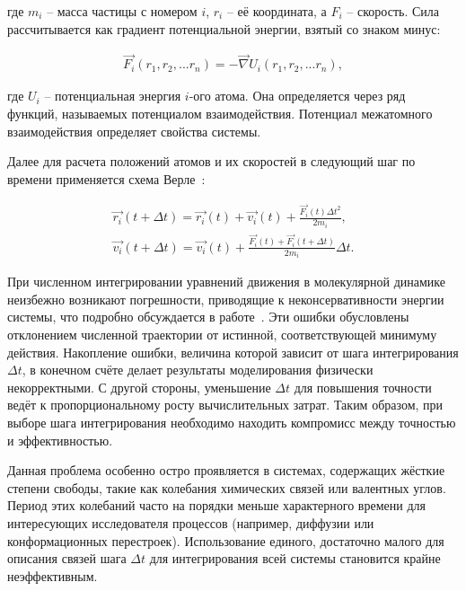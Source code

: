 где $m_i$ \--- масса частицы с номером $i$, $r_i$ \--- её координата, а $F_i$ \--- скорость. Сила рассчитывается как  градиент потенциальной энергии, взятый со знаком минус:

\begin{align}
	\overrightarrow{F_i}(r_1, r_2, ... r_n) = -\overrightarrow{\nabla}U_i(r_1, r_2, ... r_n),
\end{align}

где $U_i$ \--- потенциальная энергия $i$-ого атома. Она определяется через ряд функций, называемых потенциалом взаимодействия. Потенциал межатомного взаимодействия определяет свойства системы. 

Далее для расчета положений атомов и их скоростей в следующий шаг по времени применяется схема Верле~\cite{verlet_computer_1967}:

\begin{subequations}
    \begin{gather}
		\overrightarrow{r_i}(t+\Delta t) = \overrightarrow{r_i}(t) + \overrightarrow{v_i}(t) + \frac{\overrightarrow{F_i}(t)\Delta t^2}{2m_i},\\
		\overrightarrow{v_i}(t+\Delta t) = \overrightarrow{v_i}(t) + \frac{\overrightarrow{F_i}(t)+\overrightarrow{F_i}(t+\Delta t)}{2m_i}\Delta t.
    \end{gather}
\end{subequations}

При численном интегрировании уравнений движения в молекулярной динамике неизбежно возникают погрешности, приводящие к неконсервативности энергии системы, что подробно обсуждается в работе~\cite{norman_stochastic_2013}. Эти ошибки обусловлены отклонением численной траектории от истинной, соответствующей минимуму действия. Накопление ошибки, величина которой зависит от шага интегрирования $\Delta t$, в конечном счёте делает результаты моделирования физически некорректными. С другой стороны, уменьшение $\Delta t$ для повышения точности ведёт к пропорциональному росту вычислительных затрат. Таким образом, при выборе шага интегрирования необходимо находить компромисс между точностью и эффективностью.

Данная проблема особенно остро проявляется в системах, содержащих жёсткие степени свободы, такие как колебания химических связей или валентных углов. Период этих колебаний часто на порядки меньше характерного времени для интересующих исследователя процессов (например, диффузии или конформационных перестроек). Использование единого, достаточно малого для описания связей шага $\Delta t$ для интегрирования всей системы становится крайне неэффективным.


